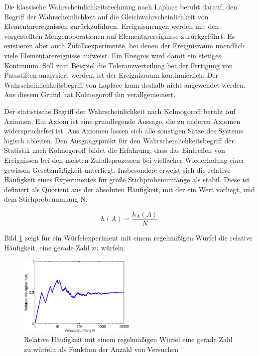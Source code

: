 \noindent Die klassische Wahrscheinlichkeitsrechnung nach Laplace beruht darauf, den Begriff der Wahrscheinlichkeit auf die Gleichwahrscheinlichkeit von Elementarereignissen zur\"{u}ckzuf\"{u}hren. Ereignismengen werden mit den vorgestellten Mengenoperationen auf Elementarereignisse zur\"{u}ckgef\"{u}hrt. Es existieren aber auch Zufallsexperimente, bei denen der Ereignisraum unendlich viele Elementarereignisse aufweist. Ein Ereignis wird damit ein stetiges Kontinuum. Soll zum Beispiel die Toleranzverteilung bei der Fertigung von Passstiften analysiert werden, ist der Ereignisraum kontinuierlich. Der Wahrscheinlichkeitsbegriff von Laplace kann deshalb nicht angewendet werden. Aus diesem Grund hat Kolmogoroff ihn verallgemeinert.\newline

\noindent Der statistische Begriff der Wahrscheinlichkeit nach Kolmogoroff beruht auf Axiomen. Ein Axiom ist eine grundlegende Aussage, die zu anderen Axiomen widerspruchsfrei ist. Aus Axiomen lassen sich alle sonstigen S\"{a}tze des Systems logisch ableiten. Den Ausgangspunkt f\"{u}r den Wahrscheinlichkeitsbegriff der Statistik nach Kolmogoroff bildet die Erfahrung, dass das Eintreffen von Ereignissen bei den meisten Zufallsprozessen bei vielfacher Wiederholung einer gewissen Gesetzm\"{a}{\ss}igkeit unterliegt. Insbesondere erweist sich die relative H\"{a}ufigkeit eines Experimentes f\"{u}r gro{\ss}e Stichprobenumf\"{a}nge als stabil. Diese ist definiert als Quotient aus der absoluten H\"{a}ufigkeit, mit der ein Wert vorliegt, und dem Stichprobenumfang N.

\begin{equation}\label{eq:twothirtyseven}
h(A)=\dfrac{h_{A} (A)}{N}
\end{equation}

\noindent Bild \ref{fig:RelativeHaeufigkeitBeimWuerfeln} zeigt f\"{u}r ein W\"{u}rfelexperiment mit einem regelm\"{a}{\ss}igen W\"{u}rfel die relative H\"{a}ufigkeit, eine gerade Zahl zu w\"{u}rfeln.

\noindent 
\begin{figure}[H]
  \centerline{\includegraphics[width=0.5\textwidth]{Kapitel2/Bilder/image9}}
  \caption{Relative H\"{a}ufigkeit mit einem regelm\"{a}{\ss}igen W\"{u}rfel eine gerade Zahl zu w\"{u}rfeln als Funktion der Anzahl von Versuchen}
  \label{fig:RelativeHaeufigkeitBeimWuerfeln}
\end{figure}

